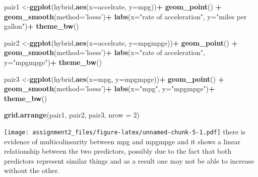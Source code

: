 \documentclass[]{article}
\newenvironment{Shaded}{\begin{snugshade}}{\end{snugshade}}
\newcommand{\DataTypeTok}[1]{\textcolor[rgb]{0.13,0.29,0.53}{#1}}
\newcommand{\DecValTok}[1]{\textcolor[rgb]{0.00,0.00,0.81}{#1}}
\newcommand{\KeywordTok}[1]{\textcolor[rgb]{0.13,0.29,0.53}{\textbf{#1}}}
\newcommand{\NormalTok}[1]{#1}
\newcommand{\OperatorTok}[1]{\textcolor[rgb]{0.81,0.36,0.00}{\textbf{#1}}}
\newcommand{\StringTok}[1]{\textcolor[rgb]{0.31,0.60,0.02}{#1}}
\begin{document}
\begin{Shaded}
\begin{Highlighting}[]
\NormalTok{pair1 <-}\KeywordTok{ggplot}\NormalTok{(hybrid,}\KeywordTok{aes}\NormalTok{(}\DataTypeTok{x=}\NormalTok{accelrate, }\DataTypeTok{y=}\NormalTok{mpg))}\OperatorTok{+}
\StringTok{  }\KeywordTok{geom_point}\NormalTok{() }\OperatorTok{+}
\StringTok{  }\KeywordTok{geom_smooth}\NormalTok{(}\DataTypeTok{method=}\StringTok{'loess'}\NormalTok{)}\OperatorTok{+}
\StringTok{  }\KeywordTok{labs}\NormalTok{(}\DataTypeTok{x=}\StringTok{"rate of acceleration"}\NormalTok{, }\DataTypeTok{y=}\StringTok{"miles per gallon"}\NormalTok{)}\OperatorTok{+}
\StringTok{  }\KeywordTok{theme_bw}\NormalTok{()}

\NormalTok{pair2 <-}\KeywordTok{ggplot}\NormalTok{(hybrid,}\KeywordTok{aes}\NormalTok{(}\DataTypeTok{x=}\NormalTok{accelrate, }\DataTypeTok{y=}\NormalTok{mpgmpge))}\OperatorTok{+}
\StringTok{  }\KeywordTok{geom_point}\NormalTok{() }\OperatorTok{+}
\StringTok{  }\KeywordTok{geom_smooth}\NormalTok{(}\DataTypeTok{method=}\StringTok{'loess'}\NormalTok{)}\OperatorTok{+}
\StringTok{  }\KeywordTok{labs}\NormalTok{(}\DataTypeTok{x=}\StringTok{"rate of acceleration"}\NormalTok{, }\DataTypeTok{y=}\StringTok{"mpgmpge"}\NormalTok{)}\OperatorTok{+}
\StringTok{  }\KeywordTok{theme_bw}\NormalTok{()}

\NormalTok{pair3 <-}\KeywordTok{ggplot}\NormalTok{(hybrid,}\KeywordTok{aes}\NormalTok{(}\DataTypeTok{x=}\NormalTok{mpg, }\DataTypeTok{y=}\NormalTok{mpgmpge))}\OperatorTok{+}
\StringTok{  }\KeywordTok{geom_point}\NormalTok{() }\OperatorTok{+}
\StringTok{  }\KeywordTok{geom_smooth}\NormalTok{(}\DataTypeTok{method=}\StringTok{'loess'}\NormalTok{)}\OperatorTok{+}
\StringTok{  }\KeywordTok{labs}\NormalTok{(}\DataTypeTok{x=}\StringTok{"mpg"}\NormalTok{, }\DataTypeTok{y=}\StringTok{"mpgmpge"}\NormalTok{)}\OperatorTok{+}
\StringTok{  }\KeywordTok{theme_bw}\NormalTok{()}

\KeywordTok{grid.arrange}\NormalTok{(pair1, pair2, pair3, }\DataTypeTok{nrow =} \DecValTok{2}\NormalTok{)}
\end{Highlighting}
\end{Shaded}

\texttt{[image: assignment2\_files/figure-latex/unnamed-chunk-5-1.pdf]}
there is evidence of multicolinearity between mpg and mpgmpge and it
shows a linear relationship between the two predictors, possibly due to
the fact that both predictors represent similar things and as a result
one may not be able to increase without the other.
\end{document}

